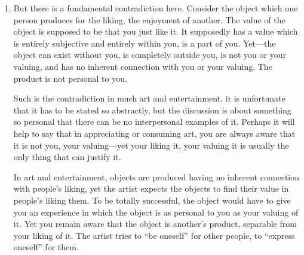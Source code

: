 \begin{enumerate}[label=\textbf{\arabic*.}, wide, itemsep=1em]
People have every reason, then, to ask the artist: Is your product good for me even if I don't like or enjoy it? This question really lays art open. One of the distinguishing features of art has always been that it is very difficult to defend art without referring to people's liking or enjoying it. (Functions of art such as making money or glorifying the social order are real enough, but they are rarely cited in defense of art. Let us put them aside.) When one artist shows his latest production to another, all he can usually ask is \enquote{Do you like it?} Once the \enquote{scientific} justification of art is discredited, the artist usually has to admit: If you don't like or enjoy my product, there's no reason why you should \enquote{consume} it. 

There are exceptions. Art sometimes becomes the sole channel for political dissent, the sole arena in which oppressive social relations can be transcended. Even so, subjectivity of value remains a feature which distinguishes art and entertainment from other activities. Thus art is historically a leisure activity. 

\item But there is a fundamental contradiction here. Consider the object which one person produces for the liking, the enjoyment of another. The value of the object is supposed to be that you just like it. It supposedly has a value which is entirely subjective and entirely within you, is a part of you. Yet---the object can exist without you, is completely outside you, is not you or your valuing, and has no inherent connection with you or your valuing. The product is not personal to you. 

Such is the contradiction in much art and entertainment. it is unfortunate that it has to be stated so abstractly, but the discussion is about something so personal that there can be no interpersonal examples of it. Perhaps it will help to say that in appreciating or consuming art, you are always aware that it is not you, your valuing---yet your liking it, your valuing it is usually the only thing that can justify it. 

In art and entertainment, objects are produced having no inherent connection with people's liking, yet the artist expects the objects to find their value in people's liking them. To be totally successful, the object would have to give you an experience in which the object is as personal to you as your valuing of it. Yet you remain aware that the object is another's product, separable from your liking of it. The artist tries to \enquote{be oneself} for other people, to \enquote{express oneself} for them. 


\end{enumerate}
